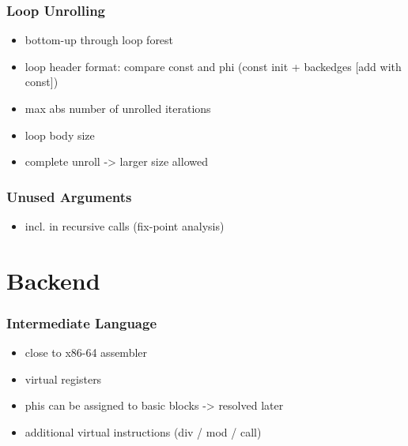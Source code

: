 \documentclass[navbaroff,en]{sdqbeamer}
\begin{document}
\begin{frame}
    \frametitle{Loop Unrolling}

    \begin{itemize}
        \item bottom-up through loop forest
        \item loop header format: compare const and phi (const init + backedges [add with const])
        \item max abs number of unrolled iterations
        \item loop body size
        \item complete unroll -> larger size allowed
    \end{itemize}

\end{frame}

\begin{frame}
    \frametitle{Unused Arguments}

    \begin{itemize}
        \item incl. in recursive calls (fix-point analysis)
    \end{itemize}

\end{frame}


\section{Backend}

\begin{frame}
    \frametitle{Intermediate Language}

    \begin{itemize}
        \item close to x86-64 assembler
        \item virtual registers
        \item phis can be assigned to basic blocks -> resolved later
        \item additional virtual instructions (div / mod / call)
    \end{itemize}

\end{frame}
\end{document}
